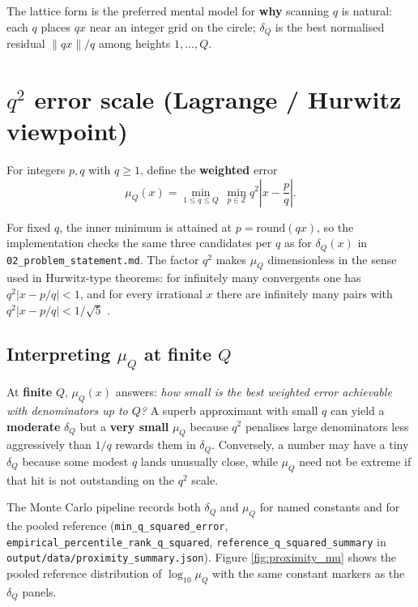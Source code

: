 \documentclass[
]{article}
\begin{document}
The lattice form is the preferred mental model for \textbf{why} scanning
\(q\) is natural: each \(q\) places \(qx\) near an integer grid on the
circle; \(\delta_Q\) is the best normalised residual \(\|qx\|/q\) among
heights \(1,\ldots,Q\).

\newpage

\section{\texorpdfstring{\(q^2\) error scale (Lagrange / Hurwitz
viewpoint)}{q\^{}2 error scale (Lagrange / Hurwitz viewpoint)}}\label{q2-error-scale-lagrange-hurwitz-viewpoint}

For integers \(p,q\) with \(q \geq 1\), define the \textbf{weighted}
error \begin{equation}
\label{eq:lagrange}
\mu_Q(x) = \min_{1 \leq q \leq Q}\ \min_{p \in \mathbb{Z}} q^2 \left| x - \frac{p}{q} \right|.
\end{equation}

For fixed \(q\), the inner minimum is attained at
\(p = \mathrm{round}(qx)\), so the implementation checks the same three
candidates per \(q\) as for \(\delta_Q(x)\) in
\texttt{02\_problem\_statement.md}. The factor \(q^2\) makes \(\mu_Q\)
dimensionless in the sense used in Hurwitz-type theorems: for infinitely
many convergents one has \(q^2|x - p/q| < 1\), and for every irrational
\(x\) there are infinitely many pairs with \(q^2|x-p/q| < 1/\sqrt{5}\)
\citep{hurwitz1891}.

\subsection{\texorpdfstring{Interpreting \(\mu_Q\) at finite
\(Q\)}{Interpreting \textbackslash mu\_Q at finite Q}}\label{interpreting-mu_q-at-finite-q}

At \textbf{finite} \(Q\), \(\mu_Q(x)\) answers: \emph{how small is the
best weighted error achievable with denominators up to \(Q\)?} A superb
approximant with small \(q\) can yield a \textbf{moderate} \(\delta_Q\)
but a \textbf{very small} \(\mu_Q\) because \(q^2\) penalises large
denominators less aggressively than \(1/q\) rewards them in
\(\delta_Q\). Conversely, a number may have a tiny \(\delta_Q\) because
some modest \(q\) lands unusually close, while \(\mu_Q\) need not be
extreme if that hit is not outstanding on the \(q^2\) scale.

The Monte Carlo pipeline records both \(\delta_Q\) and \(\mu_Q\) for
named constants and for the pooled reference
(\texttt{min\_q\_squared\_error},
\texttt{empirical\_percentile\_rank\_q\_squared},
\texttt{reference\_q\_squared\_summary} in
\texttt{output/data/proximity\_summary.json}). Figure
\ref{fig:proximity_mu} shows the pooled reference distribution of
\(\log_{10}\mu_Q\) with the same constant markers as the \(\delta_Q\)
panels.
\end{document}

